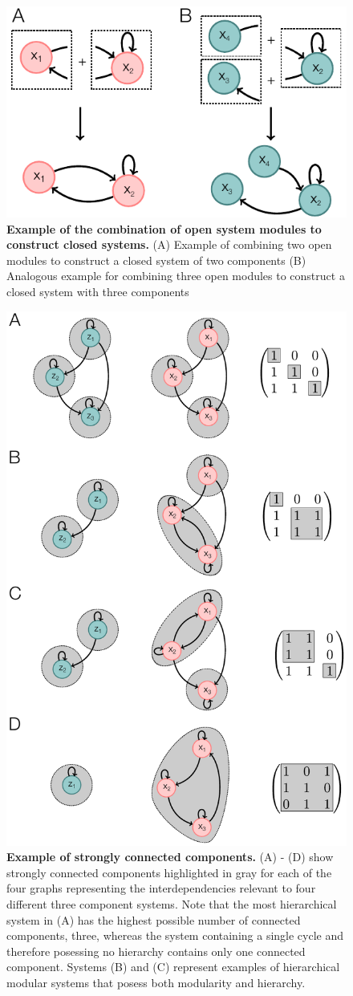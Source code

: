 \begin{figure}[!ht]
\centering
\noindent\includegraphics[width=0.4\columnwidth]{fig/examplesystemmodules.pdf}
\caption{{\bf Example of the combination of open system modules to construct closed systems.} (A) Example of combining two open modules to construct a closed system of two components (B) Analogous example for combining three open modules to construct a closed system with three components}
\label{fig:examplesystemmodules}
\end{figure}

\pagebreak

\begin{figure}[!ht]
\centering
\noindent\includegraphics[width=0.4\columnwidth]{fig/scc2.pdf}
\caption{{\bf Example of strongly connected components.} (A) - (D) show strongly connected components highlighted in gray for each of the four graphs representing the interdependencies relevant to four different three component systems. Note that the most hierarchical system in (A) has the highest possible number of connected components, three, whereas the system containing a single cycle and therefore posessing no hierarchy contains only one connected component. Systems (B) and (C) represent examples of hierarchical modular systems that posess both modularity and hierarchy.}
\label{fig:scc}
\end{figure}

